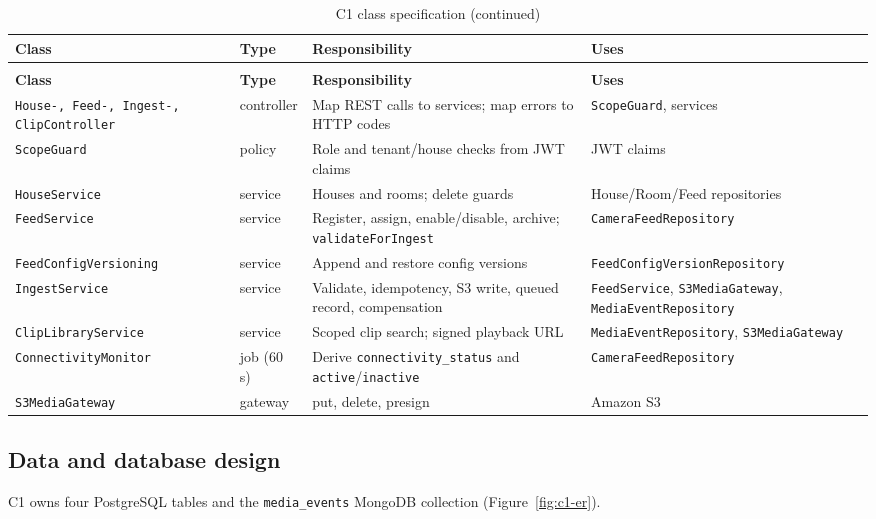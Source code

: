 \begin{longtable}{L{3.6cm}L{1.9cm}L{5.8cm}L{3.5cm}}
\caption{C1 class specification}\label{tab:c1-classspec}\\
\toprule
\textbf{Class} & \textbf{Type} & \textbf{Responsibility} & \textbf{Uses} \\
\midrule
\endfirsthead
\caption[]{C1 class specification (continued)}\\
\toprule
\textbf{Class} & \textbf{Type} & \textbf{Responsibility} & \textbf{Uses} \\
\midrule
\endhead
\texttt{House-, Feed-, Ingest-, ClipController} & controller & Map REST calls to services; map errors to HTTP codes & \texttt{ScopeGuard}, services \\
\texttt{ScopeGuard} & policy & Role and tenant/house checks from JWT claims & JWT claims \\
\texttt{HouseService} & service & Houses and rooms; delete guards & House/Room/Feed repositories \\
\texttt{FeedService} & service & Register, assign, enable/disable, archive; \texttt{validateForIngest} & \texttt{CameraFeedRepository} \\
\texttt{FeedConfigVersioning} & service & Append and restore config versions & \texttt{FeedConfigVersion\allowbreak Repository} \\
\texttt{IngestService} & service & Validate, idempotency, S3 write, queued record, compensation & \texttt{FeedService}, \texttt{S3MediaGateway}, \texttt{MediaEventRepository} \\
\texttt{ClipLibrary\allowbreak Service} & service & Scoped clip search; signed playback URL & \texttt{MediaEventRepository}, \texttt{S3MediaGateway} \\
\texttt{ConnectivityMonitor} & job (60 s) & Derive \texttt{connectivity\_status} and \texttt{active}/\texttt{inactive} & \texttt{CameraFeedRepository} \\
\texttt{S3MediaGateway} & gateway & put, delete, presign & Amazon S3 \\
\bottomrule
\end{longtable}

\subsection{Data and database design}
C1 owns four PostgreSQL tables and the \texttt{media\_events} MongoDB collection (Figure~\ref{fig:c1-er}).



